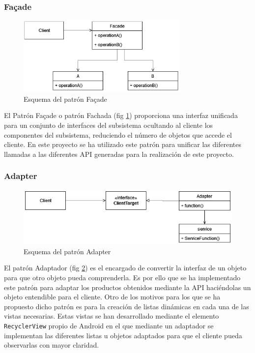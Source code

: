 \subsubsection{\textbf{Façade}}
\begin{figure}[H]
    \centering
    \includegraphics[width=0.75\textwidth]{Images/Capitulo6/facade.png}
    \caption{Esquema del patrón Façade}
    \label{fig:facade}
\end{figure}
El Patrón Façade o patrón Fachada (fig \ref{fig:facade}) proporciona una interfaz unificada para un conjunto de interfaces del subsistema ocultando al cliente los componentes del subsistema, reduciendo el número de objetos que accede el cliente.
En este proyecto se ha utilizado este patrón para unificar las diferentes llamadas a las diferentes API generadas para la realización de este proyecto.

\subsubsection{\textbf{Adapter}}
\begin{figure}[H]
    \centering
    \includegraphics[width=\textwidth]{Images/Capitulo6/adapter.png}
    \caption{Esquema del patrón Adapter}
    \label{fig:adapter}
\end{figure}
El patrón Adaptador (fig \ref{fig:adapter}) es el encargado de convertir la interfaz de un objeto para que otro objeto pueda comprenderla.
Es por ello que se ha implementado este patrón para adaptar los productos obtenidos mediante la API haciéndolas un objeto entendible para el cliente. 
Otro de los motivos para los que se ha propuesto dicho patrón es para la creación de listas dinámicas en cada una de las vistas necesarias. Estas vistas se han desarrollado mediante el elemento \texttt{RecyclerView} propio de Android en el que mediante un adaptador se implementan las diferentes listas u objetos adaptados para que el cliente pueda observarlas con mayor claridad.

